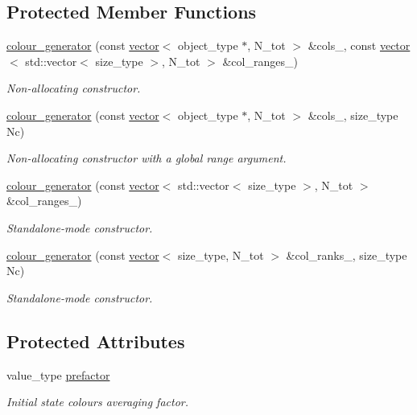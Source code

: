 \subsection*{Protected Member Functions}
\begin{DoxyCompactItemize}
\item 
\hyperlink{a00078_abcc832bac1c602913af2ff13035eea6f}{colour\+\_\+generator} (const \hyperlink{a00579}{vector}$<$ object\+\_\+type $\ast$, N\+\_\+tot $>$ \&cols\+\_\+, const \hyperlink{a00579}{vector}$<$ std\+::vector$<$ size\+\_\+type $>$, N\+\_\+tot $>$ \&col\+\_\+ranges\+\_\+)
\begin{DoxyCompactList}\small\item\em Non-\/allocating constructor. \end{DoxyCompactList}\item 
\hypertarget{a00078_a3d3a17d89e455874add368c000cdf009}{}\hyperlink{a00078_a3d3a17d89e455874add368c000cdf009}{colour\+\_\+generator} (const \hyperlink{a00579}{vector}$<$ object\+\_\+type $\ast$, N\+\_\+tot $>$ \&cols\+\_\+, size\+\_\+type Nc)\label{a00078_a3d3a17d89e455874add368c000cdf009}

\begin{DoxyCompactList}\small\item\em Non-\/allocating constructor with a global range argument. \end{DoxyCompactList}\item 
\hyperlink{a00078_af24b9e1568c3cfcdee5bcc68cb3887f6}{colour\+\_\+generator} (const \hyperlink{a00579}{vector}$<$ std\+::vector$<$ size\+\_\+type $>$, N\+\_\+tot $>$ \&col\+\_\+ranges\+\_\+)
\begin{DoxyCompactList}\small\item\em Standalone-\/mode constructor. \end{DoxyCompactList}\item 
\hyperlink{a00078_a473e0ae72e1caebca747cbc4d63544b0}{colour\+\_\+generator} (const \hyperlink{a00579}{vector}$<$ size\+\_\+type, N\+\_\+tot $>$ \&col\+\_\+ranks\+\_\+, size\+\_\+type Nc)
\begin{DoxyCompactList}\small\item\em Standalone-\/mode constructor. \end{DoxyCompactList}\end{DoxyCompactItemize}
\subsection*{Protected Attributes}
\begin{DoxyCompactItemize}
\item 
\hypertarget{a00078_aa86ff60881da662e7dc5b26c33b735ff}{}value\+\_\+type \hyperlink{a00078_aa86ff60881da662e7dc5b26c33b735ff}{prefactor}\label{a00078_aa86ff60881da662e7dc5b26c33b735ff}

\begin{DoxyCompactList}\small\item\em Initial state colours averaging factor. \end{DoxyCompactList}\end{DoxyCompactItemize}


